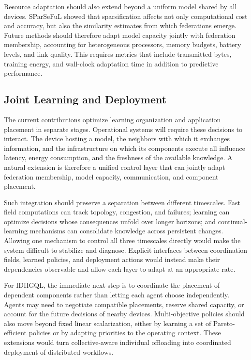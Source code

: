 Resource adaptation should also extend beyond a uniform model shared by all devices. 
%
SParSeFuL showed that sparsification affects not only computational cost and accuracy, 
 but also the similarity estimates from which federations emerge.
%
Future methods should therefore adapt model capacity jointly with federation membership, 
 accounting for heterogeneous processors, memory budgets, battery levels, and link quality. 
% 
This requires metrics that include transmitted bytes, training energy, 
 and wall-clock adaptation time in addition to predictive performance.

\subsection{Joint Learning and Deployment}

The current contributions optimize learning organization 
 and application placement in separate stages. 
% 
Operational systems will require these decisions to interact.
%
The device hosting a model, 
 the neighbors with which it exchanges information,
 and the infrastructure on which its components execute all influence latency,
 energy consumption, and the freshness of the available knowledge. 
% 
A natural extension is therefore a unified control layer that 
 can jointly adapt federation membership, model capacity, communication, and component placement.

Such integration should preserve a separation between different timescales.
%
Fast field computations can track topology, congestion, and failures; 
 learning can optimize decisions whose consequences unfold over longer horizons; 
 and continual-learning mechanisms can consolidate knowledge across persistent changes. 
% 
Allowing one mechanism to control all three timescales directly 
 would make the system difficult to stabilize and diagnose. 
% 
Explicit interfaces between coordination fields, learned policies, 
 and deployment actions would instead make their dependencies observable 
 and allow each layer to adapt at an appropriate rate.

For IDHGQL, 
 the immediate next step is to coordinate the placement of dependent
 components rather than letting each agent choose independently. 
% 
Agents may need to negotiate compatible placements, reserve shared capacity, 
 or account for the future decisions of nearby devices. 
% 
Multi-objective policies should also move beyond fixed linear scalarization, 
 either by learning a set of Pareto-efficient policies or by adapting priorities to the operating context. 
% 
These extensions would turn collective-aware individual offloading into coordinated deployment 
 of distributed workflows.

